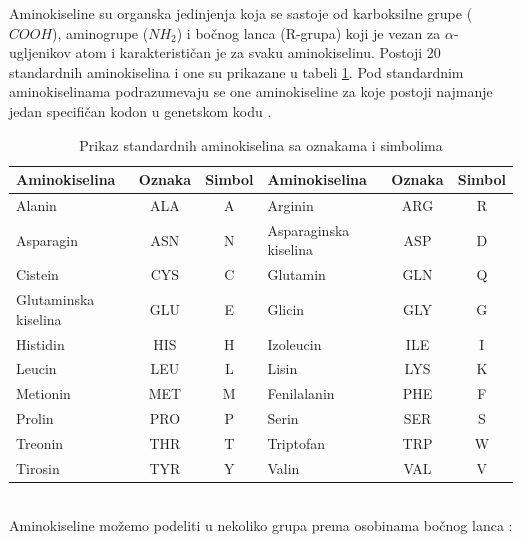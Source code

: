 Aminokiseline su organska jedinjenja koja se sastoje od karboksilne grupe ($COOH$), aminogrupe ($NH_2$) i bočnog lanca (R-grupa) koji je vezan za $\alpha$-ugljenikov atom i karakterističan je za svaku aminokiselinu. Postoji 20 standardnih aminokiselina i one su prikazane u tabeli \ref{tab: aminoacids}. Pod standardnim aminokiselinama podrazumevaju se one aminokiseline za koje postoji najmanje jedan specifičan kodon u genetskom kodu \cite{biochemestry5, biohUdz, straus}.


\begin{table}
	\centering
	\caption{Prikaz standardnih aminokiselina sa oznakama i simbolima}
	\label{tab: aminoacids}
	\begin{tabular}{|lcc|lcc|}
		\hline
		Aminokiselina & Oznaka & Simbol & Aminokiselina & Oznaka & Simbol \\
		\hline
		Alanin & ALA & A & Arginin & ARG & R  \\
		Asparagin & ASN & N & Asparaginska kiselina & ASP & D \\
		Cistein & CYS & C & Glutamin & GLN & Q  \\
		Glutaminska kiselina & GLU & E & Glicin & GLY & G  \\
		Histidin & HIS & H & Izoleucin & ILE & I  \\
		Leucin & LEU & L & Lisin & LYS & K  \\
		Metionin & MET & M & Fenilalanin & PHE & F  \\
		Prolin & PRO & P & Serin & SER & S  \\
		Treonin & THR & T & Triptofan & TRP & W  \\
		Tirosin & TYR & Y & Valin & VAL & V \\
		\hline             
	\end{tabular}
\end{table}

~ \\
\noindent Aminokiseline možemo podeliti u nekoliko grupa prema osobinama bočnog lanca \cite{biochemestry5, biohUdz, bioinf}:

